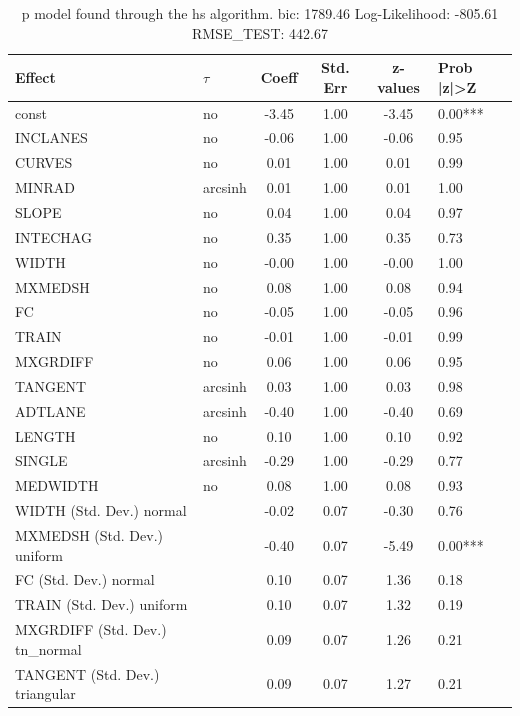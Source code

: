 \begin{table}
	\caption{p model found through the hs algorithm. bic: 1789.46 Log-Likelihood: -805.61 RMSE_TEST: 442.67}
	\begin{center}
		\begin{tabular}{|l|l|c|c|c|l|}
			\hline
			Effect & $\tau$ & Coeff & Std. Err & z-values & Prob |z|>Z \\
			\hline
			const & no & -3.45 & 1.00 & -3.45 & 0.00*** \\
			\hline
			INCLANES & no & -0.06 & 1.00 & -0.06 & 0.95 \\
			\hline
			CURVES & no & 0.01 & 1.00 & 0.01 & 0.99 \\
			\hline
			MINRAD & arcsinh & 0.01 & 1.00 & 0.01 & 1.00 \\
			\hline
			SLOPE & no & 0.04 & 1.00 & 0.04 & 0.97 \\
			\hline
			INTECHAG & no & 0.35 & 1.00 & 0.35 & 0.73 \\
			\hline
			WIDTH & no & -0.00 & 1.00 & -0.00 & 1.00 \\
			\hline
			MXMEDSH & no & 0.08 & 1.00 & 0.08 & 0.94 \\
			\hline
			FC & no & -0.05 & 1.00 & -0.05 & 0.96 \\
			\hline
			TRAIN & no & -0.01 & 1.00 & -0.01 & 0.99 \\
			\hline
			MXGRDIFF & no & 0.06 & 1.00 & 0.06 & 0.95 \\
			\hline
			TANGENT & arcsinh & 0.03 & 1.00 & 0.03 & 0.98 \\
			\hline
			ADTLANE & arcsinh & -0.40 & 1.00 & -0.40 & 0.69 \\
			\hline
			LENGTH & no & 0.10 & 1.00 & 0.10 & 0.92 \\
			\hline
			SINGLE & arcsinh & -0.29 & 1.00 & -0.29 & 0.77 \\
			\hline
			MEDWIDTH & no & 0.08 & 1.00 & 0.08 & 0.93 \\
			\hline
			WIDTH (Std. Dev.) normal &  & -0.02 & 0.07 & -0.30 & 0.76 \\
			\hline
			MXMEDSH (Std. Dev.) uniform &  & -0.40 & 0.07 & -5.49 & 0.00*** \\
			\hline
			FC (Std. Dev.) normal &  & 0.10 & 0.07 & 1.36 & 0.18 \\
			\hline
			TRAIN (Std. Dev.) uniform &  & 0.10 & 0.07 & 1.32 & 0.19 \\
			\hline
			MXGRDIFF (Std. Dev.) tn_normal &  & 0.09 & 0.07 & 1.26 & 0.21 \\
			\hline
			TANGENT (Std. Dev.) triangular &  & 0.09 & 0.07 & 1.27 & 0.21 \\

\end{tabular}
\end{center}
\end{table}
